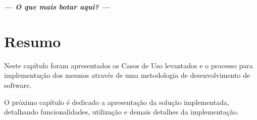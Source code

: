 \textbf{\textit{--- O que mais botar aqui? ---}}





\section*{Resumo}
Neste capítulo foram apresentados os Casos de Uso levantados e o processo para implementação dos mesmos através de uma metodologia de desenvolvimento de software.

O próximo capítulo é dedicado a apresentação da solução implementada, detalhando funcionalidades, utilização e demais detalhes da implementação.